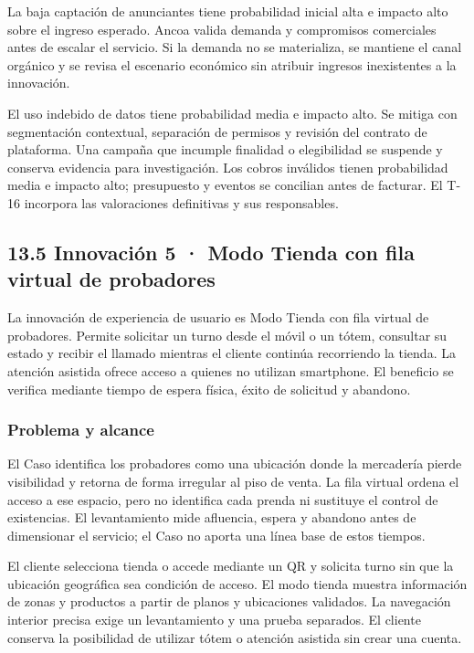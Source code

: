 \documentclass[11pt]{article}
\begin{document}
La baja captación de anunciantes tiene probabilidad inicial alta e impacto alto sobre el ingreso esperado. Ancoa valida demanda y compromisos comerciales antes de escalar el servicio. Si la demanda no se materializa, se mantiene el canal orgánico y se revisa el escenario económico sin atribuir ingresos inexistentes a la innovación.

El uso indebido de datos tiene probabilidad media e impacto alto. Se mitiga con segmentación contextual, separación de permisos y revisión del contrato de plataforma. Una campaña que incumple finalidad o elegibilidad se suspende y conserva evidencia para investigación. Los cobros inválidos tienen probabilidad media e impacto alto; presupuesto y eventos se concilian antes de facturar. El T-16 incorpora las valoraciones definitivas y sus responsables.

\subsection{13.5 Innovación 5 · Modo Tienda con fila virtual de probadores}\label{innovaciuxf3n-5}

La innovación de experiencia de usuario es Modo Tienda con fila virtual de probadores. Permite solicitar un turno desde el móvil o un tótem, consultar su estado y recibir el llamado mientras el cliente continúa recorriendo la tienda. La atención asistida ofrece acceso a quienes no utilizan smartphone. El beneficio se verifica mediante tiempo de espera física, éxito de solicitud y abandono.

\subsubsection{Problema y alcance}\label{problema-y-alcance}

El Caso identifica los probadores como una ubicación donde la mercadería pierde visibilidad y retorna de forma irregular al piso de venta. La fila virtual ordena el acceso a ese espacio, pero no identifica cada prenda ni sustituye el control de existencias. El levantamiento mide afluencia, espera y abandono antes de dimensionar el servicio; el Caso no aporta una línea base de estos tiempos.

El cliente selecciona tienda o accede mediante un QR y solicita turno sin que la ubicación geográfica sea condición de acceso. El modo tienda muestra información de zonas y productos a partir de planos y ubicaciones validados. La navegación interior precisa exige un levantamiento y una prueba separados. El cliente conserva la posibilidad de utilizar tótem o atención asistida sin crear una cuenta.
\end{document}
